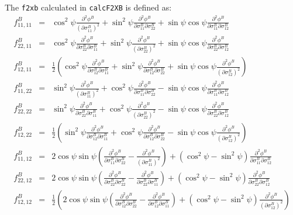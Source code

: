 \documentclass[12pt]{amsart}
\begin{document}
The \verb|f2xb| calculated in \verb|calcF2XB| is defined as:
\begin{eqnarray}
  \label{eq:f2xb}
  f_{11,11}^B &=&            \cos^2\psi \frac{\partial^2 \phi^B}{(\partial \sigma^B_{11})^2}                   + \sin^2\psi\frac{\partial^2 \phi^B}{\partial\sigma^B_{11} \partial\sigma^B_{22}} + \sin\psi\cos\psi \frac{\partial^2 \phi^B}{\partial\sigma^B_{11} \partial\sigma^B_{12}}\\
  f_{22,11}^B &=&            \cos^2\psi \frac{\partial^2 \phi^B}{\partial \sigma^B_{22}\partial \sigma^B_{11}} + \sin^2\psi\frac{\partial^2 \phi^B}{(\partial\sigma^B_{22})^2}                   + \sin\psi\cos\psi \frac{\partial^2 \phi^B}{\partial\sigma^B_{22} \partial\sigma^B_{12}}\nonumber\\
  f_{12,11}^B &=&\frac{1}{2} (\cos^2\psi \frac{\partial^2 \phi^B}{\partial \sigma^B_{12}\partial \sigma^B_{11}} + \sin^2\psi\frac{\partial^2 \phi^B}{\partial\sigma^B_{12} \partial\sigma^B_{22}} + \sin\psi\cos\psi \frac{\partial^2 \phi^B}{(\partial\sigma^B_{12})^2})\nonumber\\
  f_{11,22}^B &=&            \sin^2\psi \frac{\partial^2 \phi^B}{(\partial \sigma^B_{11})^2}                   + \cos^2\psi\frac{\partial^2 \phi^B}{\partial\sigma^B_{11} \partial\sigma^B_{22}} - \sin\psi\cos\psi \frac{\partial^2 \phi^B}{\partial\sigma^B_{11} \partial\sigma^B_{12}}\nonumber\\
  f_{22,22}^B &=&            \sin^2\psi \frac{\partial^2 \phi^B}{\partial \sigma^B_{22}\partial \sigma^B_{11}} + \cos^2\psi\frac{\partial^2 \phi^B}{(\partial\sigma^B_{22})^2}                   - \sin\psi\cos\psi \frac{\partial^2 \phi^B}{\partial\sigma^B_{22} \partial\sigma^B_{12}}\nonumber\\
  f_{12,22}^B &=&\frac{1}{2} (\sin^2\psi \frac{\partial^2 \phi^B}{\partial \sigma^B_{12}\partial \sigma^B_{11}} + \cos^2\psi\frac{\partial^2 \phi^B}{\partial\sigma^B_{12} \partial\sigma^B_{22}} - \sin\psi\cos\psi \frac{\partial^2 \phi^B}{(\partial\sigma^B_{12})^2})\nonumber\\
  f_{11,12}^B &=& 2\cos\psi\sin\psi(\frac{\partial^2 \phi^B}{\partial \sigma^B_{11}\partial \sigma^B_{22}}-\frac{\partial^2 \phi^B}{(\partial \sigma^B_{11})^2})+(\cos^2\psi-\sin^2\psi)\frac{\partial^2 \phi^B}{\partial \sigma^B_{11}\partial \sigma^B_{12}}\nonumber\\
  f_{22,12}^B &=& 2\cos\psi\sin\psi(\frac{\partial^2 \phi^B}{\partial \sigma^B_{22}\partial \sigma^B_{22}}-\frac{\partial^2 \phi^B}{\partial \sigma^B_{22}\partial \sigma^B_{11}})+(\cos^2\psi-\sin^2\psi)\frac{\partial^2 \phi^B}{\partial \sigma^B_{22}\partial \sigma^B_{12}}\nonumber\\
  f_{12,12}^B &=& \frac{1}{2}(2\cos\psi\sin\psi(\frac{\partial^2 \phi^B}{\partial \sigma^B_{12}\partial \sigma^B_{22}}-\frac{\partial^2 \phi^B}{\partial \sigma^B_{12}\partial \sigma^B_{11}})+(\cos^2\psi-\sin^2\psi)\frac{\partial^2 \phi^B}{(\partial \sigma^B_{12})^2})\nonumber
\end{eqnarray}
\end{document}
